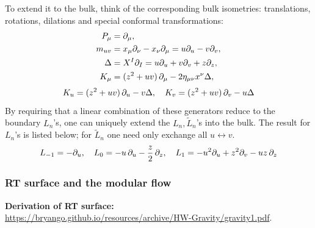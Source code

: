 \documentclass[11pt,a4paper]{article}
\begin{document}
	To extend it to the bulk, think of the corresponding bulk isometries: translations, rotations, dilations and special conformal transformations:
	\begin{equation}
	\begin{aligned}
		P_\mu
		&= \partial_{\mu},\\
		m_{uv}
		&= x_\mu \partial_{\nu} - x_\nu \partial_{\mu}
		= u\partial_{u} - v\partial_{v},\\
		\Delta
		&= X^I \partial_{I}
		= u\partial_{u} + v\partial_{v} + z\partial_{z},\\
		K_\mu
		&= (z^2 + uv)\,\partial_{\mu}
			- 2\eta_{\mu\nu} x^\nu \Delta,
	\end{aligned}
	\end{equation}
	\begin{equation}
		K_u = (z^2 + uv)\,\partial_{u} - v \Delta,
	\quad
		K_v = (z^2 + uv)\,\partial_{v} - u \Delta
	\end{equation}
	By requiring that a linear combination of these generators reduce to the boundary $L_n$'s, one can uniquely extend the $L_n,\tilde{L}_n$'s into the bulk. The result for $L_n$'s is listed below; for $\tilde{L}_n$ one need only exchange all $u\leftrightarrow v$.
	\begin{equation}
		L_{-1} = -\partial_{u},
	\quad
		L_0 = -u\,\partial_{u} - \frac{z}{2}\,\partial_{z},
	\quad
		L_1 = -u^2\partial_{u} + z^2 \partial_{v}
			- uz\,\partial_{z}
	\end{equation}

\subsubsection{RT surface and the modular flow}

\textbf{Derivation of RT surface:} \\
 \url{https://bryango.github.io/resources/archive/HW-Gravity/gravity1.pdf}. 
\end{document}
